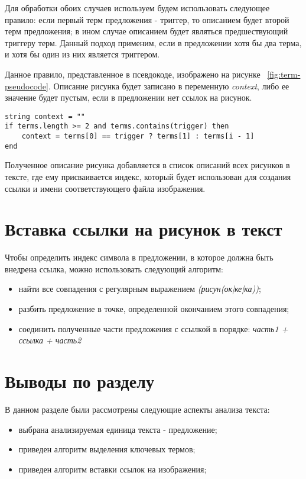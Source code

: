 Для обработки обоих случаев используем будем использовать следующее правило:
если первый терм предложения - триггер, то описанием будет второй терм
предложения; в ином случае описанием будет являться предшествующий триггеру
терм. Данный подход применим, если в предложении хотя бы два терма, и хотя бы
один из них является триггером.

Данное правило, представленное в псевдокоде, изображено на рисунке~%
\ref{fig:term-pseudocode}. Описание рисунка будет записано в переменную
\emph{context}, либо ее значение будет пустым, если в предложении
нет ссылок на рисунок.

\begin{codewrap}[0.85]
    \begin{verbatim}
string context = ""
if terms.length >= 2 and terms.contains(trigger) then
    context = terms[0] == trigger ? terms[1] : terms[i - 1]
end
    \end{verbatim}
    \caption{}\label{fig:term-pseudocode}%
\end{codewrap}

Полученное описание рисунка добавляется в список описаний всех рисунков в
тексте, где ему присваивается индекс, который будет использован для создания
ссылки и имени соответствующего файла изображения.

\section{Вставка ссылки на рисунок в текст}

Чтобы определить индекс символа в предложении, в которое должна быть внедрена
ссылка, можно использовать следующий алгоритм:

\begin{itemize}
    \item найти все совпадения с регулярным выражением \emph{(рисун(ок|ке|ка))};
    \item разбить предложение в точке, определенной окончанием этого совпадения;
    \item соединить полученные части предложения с ссылкой в порядке: \emph{
        часть1 + ссылка + часть2
    }
\end{itemize}

\section{Выводы по разделу}

В данном разделе были рассмотрены следующие аспекты анализа текста:
\begin{itemize}
    \item выбрана анализируемая единица текста - предложение;
    \item приведен алгоритм выделения ключевых термов;
    \item приведен алгоритм вставки ссылок на изображения;
\end{itemize}

